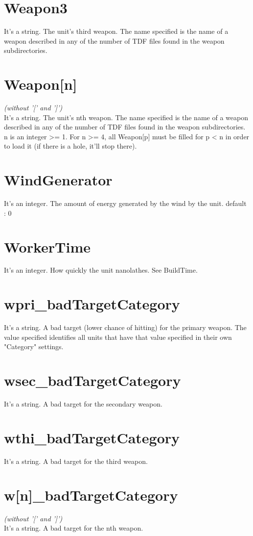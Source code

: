 \documentclass[a4paper,10pt]{article}
\begin{document}
\section{Weapon3}
It's a string. The unit's third weapon. The name specified is the name of a weapon described in any of the number of TDF files found in the weapon subdirectories.

\section{Weapon[n]}
\emph{(without '[' and ']')}\\
It's a string. The unit's nth weapon. The name specified is the name of a weapon described in any of the number of TDF files found in the weapon subdirectories. n is an integer >= 1. For n >= 4, all Weapon[p] must be filled for p < n in order to load it (if there is a hole, it'll stop there).

\section{WindGenerator}
It's an integer. The amount of energy generated by the wind by the unit. default : 0

\section{WorkerTime}
It's an integer. How quickly the unit nanolathes. See BuildTime.

\section{wpri\_badTargetCategory}
It's a string. A bad target (lower chance of hitting) for the primary weapon.  The value specified identifies all units that have that value specified in their own "Category" settings.

\section{wsec\_badTargetCategory}
It's a string. A bad target for the secondary weapon.

\section{wthi\_badTargetCategory}
It's a string. A bad target for the third weapon.

\section{w[n]\_badTargetCategory}
\emph{(without '[' and ']')}\\
It's a string. A bad target for the nth weapon.
\end{document}

